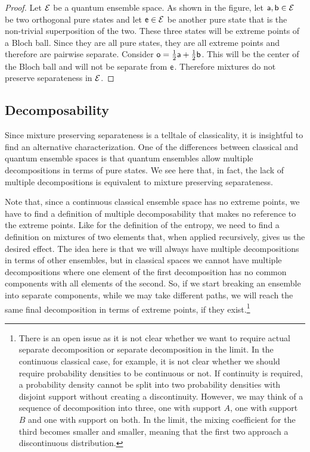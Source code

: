 \begin{mathSection}
\begin{proof}
	Let $\Ens$ be a quantum ensemble space. As shown in the figure, let $\ens[a], \ens[b] \in \Ens$ be two orthogonal pure states and let $\ens[e] \in \Ens$ be another pure state that is the non-trivial superposition of the two. These three states will be extreme points of a Bloch ball. Since they are all pure states, they are all extreme points and therefore are pairwise separate. Consider $\ens[o] = \frac{1}{2} \ens[a] + \frac{1}{2} \ens[b]$. This will be the center of the Bloch ball and will not be separate from $\ens$. Therefore mixtures do not preserve separateness in $\Ens$.
\end{proof}
\end{mathSection}

\subsection{Decomposability}

Since mixture preserving separateness is a telltale of classicality, it is insightful to find an alternative characterization. One of the differences between classical and quantum ensemble spaces is that quantum ensembles allow multiple decompositions in terms of pure states. We see here that, in fact, the lack of multiple decompositions is equivalent to mixture preserving separateness.

Note that, since a continuous classical ensemble space has no extreme points, we have to find a definition of multiple decomposability that makes no reference to the extreme points. Like for the definition of the entropy, we need to find a definition on mixtures of two elements that, when applied recursively, gives us the desired effect. The idea here is that we will always have multiple decompositions in terms of other ensembles, but in classical spaces we cannot have multiple decompositions where one element of the first decomposition has no common components with all elements of the second. So, if we start breaking an ensemble into separate components, while we may take different paths, we will reach the same final decomposition in terms of extreme points, if they exist.\footnote{There is an open issue as it is not clear whether we want to require actual separate decomposition or separate decomposition in the limit. In the continuous classical case, for example, it is not clear whether we should require probability densities to be continuous or not. If continuity is required, a probability density cannot be split into two probability densities with disjoint support without creating a discontinuity. However, we may think of a sequence of decomposition into three, one with support $A$, one with support $B$ and one with support on both. In the limit, the mixing coefficient for the third becomes smaller and smaller, meaning that the first two approach a discontinuous distribution.}

